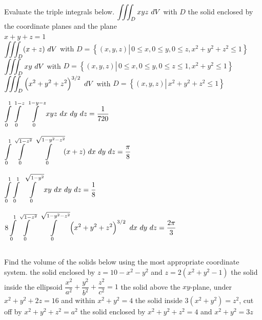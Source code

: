 \begin{Exercise} Evaluate the  triple integrals below.
    \Question[difficulty = 2] $\displaystyle \iiint_D xyz\ dV$ \quad with $D$ the solid enclosed by the coordinate planes and the plane \\ $x+y+z=1$ \\[0.1cm] 
    \Question[difficulty = 2] $\displaystyle \iiint_D (x+z) \ dV $ \quad with $D = \left\{ (x,y,z) \left|\, 0\leq x, 0 \leq y, 0 \leq z, x^2 + y^2 + z^2 \leq 1 \right. \right\}$ \\[0.1cm]  
    \Question[difficulty = 3] $\displaystyle \iiint_D xy \ dV $ \quad with $D = \left\{ (x,y,z) \left|\, 0\leq x, 0 \leq y, 0 \leq z \leq 1, x^2 + y^2 \leq 1 \right. \right\}$ \\[0.1cm]  
    \Question[difficulty = 3] $\displaystyle \iiint_D \left( x^2 + y^2 + z^2 \right)^{3/2} \ dV $ \quad with $D = \left\{ (x,y,z) \left|\,  x^2 + y^2 + z^2 \leq 1 \right. \right\}$ \\[0.1cm]  
\end{Exercise}

\begin{Answer}
    
        \Question $\displaystyle \int\limits_0^{1} \int\limits_{0}^{1-z}\ \int\limits_{0}^{1-y-z} xyz \ dx\  dy \ dz = \dfrac{1}{720}$
        
        \Question $\displaystyle \int\limits_0^{1} \int\limits_{0}^{\sqrt{1-z^2}}\ \int\limits_{0}^{\sqrt{1-y^2-z^2}} (x+z) \ dx\  dy \ dz = \dfrac{\pi}{8}$
       
        \Question $\ds \int\limits_0^{1} \int\limits_{0}^{1}\ \int\limits_{0}^{\sqrt{1-y^2}} xy \ dx\  dy \ dz = \dfrac{1}{8}$
        
        \Question $8 \displaystyle \int\limits_0^{1} \int\limits_{0}^{\sqrt{1-z^2}}\ \int\limits_{0}^{\sqrt{1-y^2-z^2}} \left( x^2 + y^2 + z^2 \right)^{3/2} \ dx\  dy \ dz = \dfrac{2\pi}{3}$
    
\end{Answer}


\subsection*{}
\begin{Exercise} Find the volume of the solids below using the most appropriate coordinate system.
    \Question[difficulty = 3] the solid enclosed by $z=10-x^2-y^2$ and $z=2(x^2+y^2-1)$ 
    \Question[difficulty = 2] the solid inside the ellipsoid $\dfrac{x^2}{a^2} + \dfrac{y^2}{b^2} + \dfrac{z^2}{c^2} = 1$ 
    \Question[difficulty = 2] the solid above the $xy$-plane, under $x^2 + y^2 + 2z = 16$ and within $x^2 + y^2 = 4$ 
    \Question[difficulty = 3] the solid inside $3(x^2+y^2) = z^2$, cut off by $x^2+y^2+z^2=a^2$
    \Question[difficulty = 2] the solid enclosed by $x^2+y^2 + z^2 = 4$ and $x^2+y^2=3z$ 
\end{Exercise}

